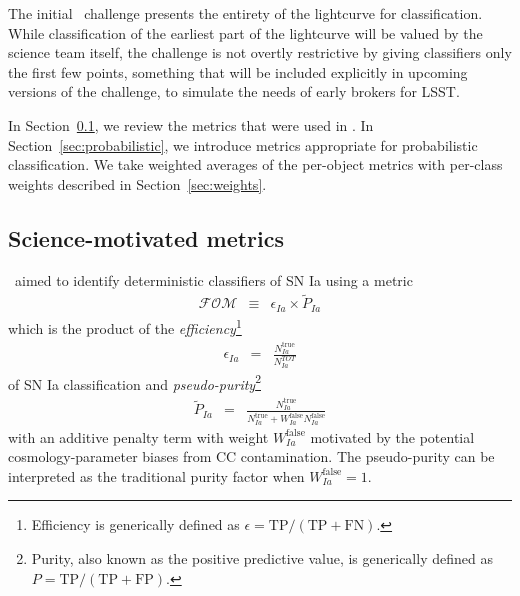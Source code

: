 The initial \plasticc\ challenge presents the entirety of the lightcurve for classification.
While classification of the earliest part of the lightcurve will be valued by the science team itself, the challenge is not overtly restrictive by giving classifiers only the first few points, something that will be included explicitly in upcoming versions of the challenge, to simulate the needs of early brokers for LSST.


In Section~\ref{sec:science}, we review the metrics that were used in \snphotcc.
In Section~\ref{sec:probabilistic}, we introduce metrics appropriate for probabilistic classification.
We take weighted averages of the per-object metrics with per-class weights described in Section~\ref{sec:weights}.

\subsection{Science-motivated metrics}
\label{sec:science}


\snphotcc\ aimed to identify deterministic classifiers of SN Ia using a metric
\begin{eqnarray}
  \label{eq:snphotccfom}
  \mathcal{FOM} &\equiv& \epsilon_{Ia} \times \tilde{P}_{Ia}
\end{eqnarray}
which is the product of the \textit{efficiency}\footnote{Efficiency is generically defined as $\epsilon = \mathrm{TP} / (\mathrm{TP} + \mathrm{FN})$.}
\begin{eqnarray}
  \label{eq:efficiency}
  \epsilon_{Ia} &=& \frac{N_{Ia}^{\mathrm{true}}}{N_{Ia}^{TOT}}
\end{eqnarray}
of SN Ia classification and \textit{pseudo-purity}\footnote{Purity, also known as the positive predictive value, is generically defined as $P = \mathrm{TP} / (\mathrm{TP} + \mathrm{FP})$.}
\begin{eqnarray}
  \label{eq:pseudopurity}
  \tilde{P}_{Ia} &=& \frac{N_{Ia}^{\mathrm{true}}}{N_{Ia}^\mathrm{true} + W_{Ia}^\mathrm{false}N_{Ia}^\mathrm{false}}
\end{eqnarray}
with an additive penalty term with weight $W_{Ia}^\mathrm{false}$ motivated by the potential cosmology-parameter biases from  CC contamination.
The pseudo-purity can be interpreted as the traditional purity factor when $W_{Ia}^\mathrm{false} = 1$.

